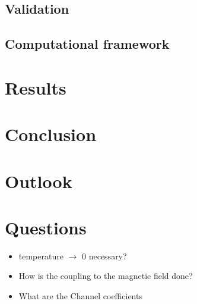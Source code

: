 \subsection{Validation}
\subsection{Computational framework}
\section{Results}
\section{Conclusion}
\section{Outlook}
\appendix


\section{Questions}
\begin{itemize}
  \item temperature $\rightarrow$ 0 necessary?
  \item How is the coupling to the magnetic field done?
  \item What are the Channel coefficients \cite{PhysRevB.31.6207}
\end{itemize}

\clearpage




